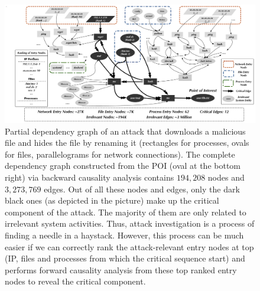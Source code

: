 

\begin{figure}[!t]
    \centering
    \includegraphics[width=\textwidth, 
                 keepaspectratio]{figs/usenix/overview.pdf}
    \caption{Partial dependency graph of an attack that downloads a malicious file and hides the file by renaming it (rectangles for processes, ovals for files, parallelograms for network connections).
    The complete dependency graph constructed from the POI (oval at the bottom right) via backward causality analysis contains $194,208$ nodes and $3,273,769$ edges.
    Out of all these nodes and edges, only the dark black ones (as depicted in the picture) make up the critical component of the attack. The majority of them are only related to irrelevant system activities.
    Thus, attack investigation is a process of finding a needle in a haystack. However, this process can be much easier if we can correctly rank the attack-relevant entry nodes at top (\ie IP, files and processes from which the critical sequence start) 
    and performs forward causality analysis from these top ranked entry nodes to reveal the critical component.
    }
    \label{fig:motivate}
\end{figure}



